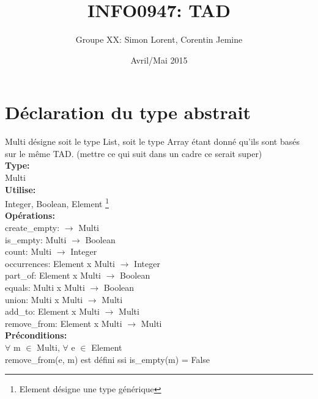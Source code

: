 \documentclass[a4paper, 11pt, oneside]{article}
\begin{document}

\title{INFO0947: TAD}
\author{Groupe XX: Simon Lorent, Corentin Jemine}
\date{Avril/Mai 2015}

\maketitle
\clearpage

\section{Déclaration du type abstrait}
	\indent Multi désigne soit le type List, soit le type Array étant donné qu'ils sont basés sur le même TAD. (mettre ce qui suit dans un cadre ce serait super)
	\\ \textbf{Type:}
	\\ \indent Multi
	\\ \textbf{Utilise:}
	\\ \indent Integer, Boolean, Element \footnote{Element désigne une type générique}
	\\ \textbf{Opérations:}
	\\ \indent create\_empty: $\rightarrow$ Multi
	\\ \indent is\_empty: Multi $\rightarrow$ Boolean
	\\ \indent count: Multi $\rightarrow$ Integer
	\\ \indent occurrences: Element x Multi $\rightarrow$ Integer
	\\ \indent part\_of: Element x Multi $\rightarrow$ Boolean
	\\ \indent equals: Multi x Multi $\rightarrow$ Boolean
	\\ \indent union: Multi x Multi $\rightarrow$ Multi
	\\ \indent add\_to: Element x Multi $\rightarrow$ Multi
	\\ \indent remove\_from: Element x Multi $\rightarrow$ Multi
	\\ \textbf{Préconditions:}
	\\ \indent $\forall$ m $\in$ Multi, $\forall$ e $\in$ Element
	\\ \indent remove\_from(e, m) est défini ssi is\_empty(m) = False
\end{document}
